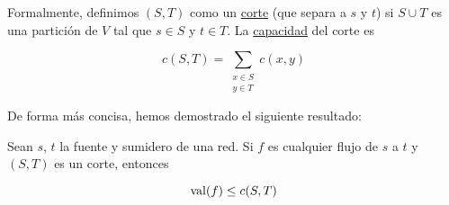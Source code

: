 \begin{defn}
    Formalmente, definimos $(S,T)$ como un \ul{corte} (que separa a $s$ y $t$) si $S \cup T$ es una partición de $V$ tal que $s \in S$ y $t \in T$. La \ul{capacidad} del corte es
    
    \[
    c(S,T) = \sum_{\substack{x\in S \\ y \in T}} c(x,y)
    \]
\end{defn}

De forma más concisa, hemos demostrado el siguiente resultado:

\begin{teo}\label{teo:cotavalor}
    Sean $s$, $t$ la fuente y sumidero de una red. Si $f$ es cualquier flujo de $s$ a $t$ y $(S,T)$ es un corte, entonces
    
    \[
    \operatorname{val}(f) \leq c(S,T)
    \]
\end{teo}